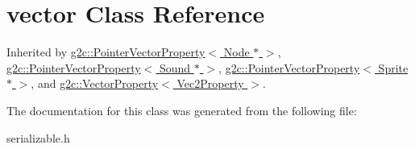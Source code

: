 \hypertarget{classstd_1_1vector}{
\section{vector Class Reference}
\label{classstd_1_1vector}
}


Inherited by \hyperlink{classg2c_1_1_pointer_vector_property}{g2c::PointerVectorProperty$<$ Node $\ast$ $>$}, \hyperlink{classg2c_1_1_pointer_vector_property}{g2c::PointerVectorProperty$<$ Sound $\ast$ $>$}, \hyperlink{classg2c_1_1_pointer_vector_property}{g2c::PointerVectorProperty$<$ Sprite $\ast$ $>$}, and \hyperlink{classg2c_1_1_vector_property}{g2c::VectorProperty$<$ Vec2Property $>$}.

The documentation for this class was generated from the following file:\begin{DoxyCompactItemize}
\item 
serializable.h\end{DoxyCompactItemize}
